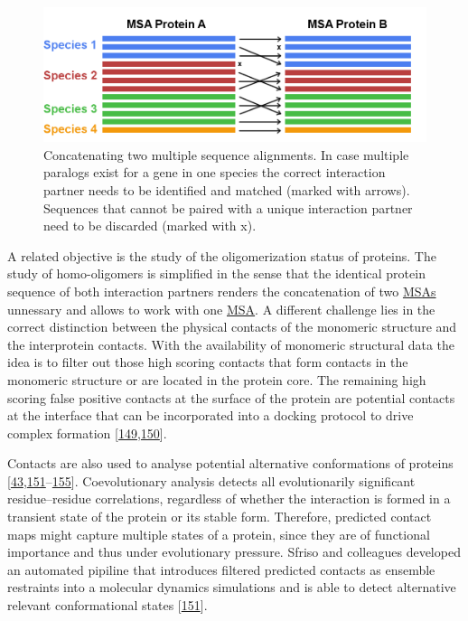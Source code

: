 \documentclass[11pt,a4paper,twoside]{book}
\theoremstyle{definition}
\theoremstyle{definition}
\theoremstyle{remark}
\begin{document}
\begin{figure}

{\centering \includegraphics[width=1\linewidth]{img/intro/matching_sequences_ppi} 

}

\caption{Concatenating two multiple sequence
alignments. In case multiple paralogs exist for a gene in one species
the correct interaction partner needs to be identified and matched
(marked with arrows). Sequences that cannot be paired with a unique
interaction partner need to be discarded (marked with x).}\label{fig:matching-sequences-ppi}
\end{figure}

A related objective is the study of the oligomerization status of
proteins. The study of homo-oligomers is simplified in the sense that
the identical protein sequence of both interaction partners renders the
concatenation of two \protect\hyperlink{abbrev}{MSAs} unnessary and
allows to work with one \protect\hyperlink{abbrev}{MSA}. A different
challenge lies in the correct distinction between the physical contacts
of the monomeric structure and the interprotein contacts. With the
availability of monomeric structural data the idea is to filter out
those high scoring contacts that form contacts in the monomeric
structure or are located in the protein core. The remaining high scoring
false positive contacts at the surface of the protein are potential
contacts at the interface that can be incorporated into a docking
protocol to drive complex formation
{[}\protect\hyperlink{ref-Uguzzoni2017}{149},\protect\hyperlink{ref-DosSantos2015a}{150}{]}.

Contacts are also used to analyse potential alternative conformations of
proteins
{[}\protect\hyperlink{ref-Parisi2015a}{43},\protect\hyperlink{ref-Sfriso2016}{151}--\protect\hyperlink{ref-Jeon2011a}{155}{]}.
Coevolutionary analysis detects all evolutionarily significant
residue--residue correlations, regardless of whether the interaction is
formed in a transient state of the protein or its stable form.
Therefore, predicted contact maps might capture multiple states of a
protein, since they are of functional importance and thus under
evolutionary pressure. Sfriso and colleagues developed an automated
pipiline that introduces filtered predicted contacts as ensemble
restraints into a molecular dynamics simulations and is able to detect
alternative relevant conformational states
{[}\protect\hyperlink{ref-Sfriso2016}{151}{]}.
\end{document}
